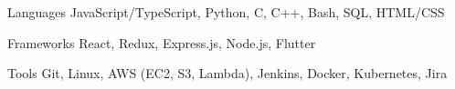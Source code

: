 

\begin{cvskills}

  \cvskill
    {Languages} %
    {JavaScript/TypeScript, Python, C, C++, Bash, SQL, HTML/CSS} %

  \cvskill
    {Frameworks} %
    {React, Redux, Express.js, Node.js, Flutter} %

  \cvskill
    {Tools} %
    {Git, Linux, AWS (EC2, S3, Lambda), Jenkins, Docker, Kubernetes, Jira} %

\end{cvskills}
